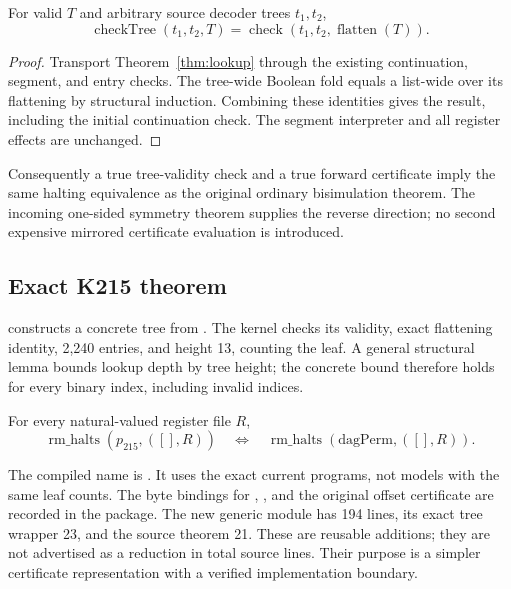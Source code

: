 \begin{theorem}
For valid \(T\) and arbitrary source decoder trees \(t_1,t_2\),
\[
 \operatorname{checkTree}(t_1,t_2,T)=
 \operatorname{check}(t_1,t_2,\operatorname{flatten}(T)).
\]
\end{theorem}
\begin{proof}
Transport Theorem~\ref{thm:lookup} through the existing continuation,
segment, and entry checks. The tree-wide Boolean fold equals a list-wide
 over its flattening by structural induction. Combining these
identities gives the result, including the initial continuation check.
The segment interpreter and all register effects are unchanged.
\end{proof}

Consequently a true tree-validity check and a true forward certificate imply
the same halting equivalence as the original ordinary bisimulation theorem.
The incoming one-sided symmetry theorem supplies the reverse direction;
no second expensive mirrored certificate evaluation is introduced.

\subsection{Exact K215 theorem}

 constructs a concrete tree from .
The kernel checks its validity, exact flattening identity, 2,240 entries,
and height 13, counting the leaf. A general structural lemma bounds lookup
depth by tree height; the concrete bound therefore holds for every binary
index, including invalid indices.

\begin{theorem}
For every natural-valued register file \(R\),
\[
 \operatorname{rm\_halts}(p_{215},([],R))
 \quad\Longleftrightarrow\quad
 \operatorname{rm\_halts}(\mathrm{dagPerm},([],R)).
\]
\end{theorem}

The compiled name is .
It uses the exact current programs, not models with the same leaf counts.
The byte bindings for , , and the original
offset certificate are recorded in the package. The new generic module has
194 lines, its exact tree wrapper 23, and the source theorem 21. These are
reusable additions; they are not advertised as a reduction in total source
lines. Their purpose is a simpler certificate representation with a verified
implementation boundary.

